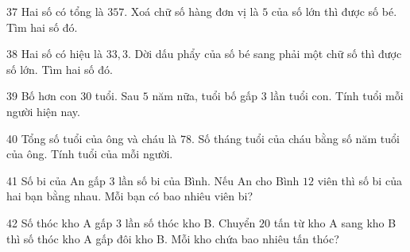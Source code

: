 \gap
\begin{probbox}{37}{}
Hai số có tổng là $357$. Xoá chữ số hàng đơn vị là $5$ của số lớn thì được số bé. Tìm hai số đó.
\end{probbox}
\gap
\begin{probbox}{38}{}
Hai số có hiệu là $33{,}3$. Dời dấu phẩy của số bé sang phải một chữ số thì được số lớn. Tìm hai số đó.
\end{probbox}
\gap
\begin{probbox}{39}{}
Bố hơn con $30$ tuổi. Sau $5$ năm nữa, tuổi bố gấp $3$ lần tuổi con. Tính tuổi mỗi người hiện nay.
\end{probbox}
\gap
\begin{probbox}{40}{}
Tổng số tuổi của ông và cháu là $78$. Số tháng tuổi của cháu bằng số năm tuổi của ông. Tính tuổi của mỗi người.
\end{probbox}
\gap
\begin{probbox}{41}{}
Số bi của An gấp $3$ lần số bi của Bình. Nếu An cho Bình $12$ viên thì số bi của hai bạn bằng nhau. Mỗi bạn có bao nhiêu viên bi?
\end{probbox}
\gap
\begin{probbox}{42}{}
Số thóc kho A gấp $3$ lần số thóc kho B. Chuyển $20$ tấn từ kho A sang kho B thì số thóc kho A gấp đôi kho B. Mỗi kho chứa bao nhiêu tấn thóc?
\end{probbox}
